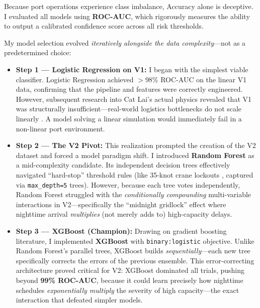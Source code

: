 \documentclass[11pt, a4paper]{article}
\begin{document}
Because port operations experience class imbalance, Accuracy alone is deceptive. I evaluated all models using \textbf{ROC-AUC}, which rigorously measures the ability to output a calibrated confidence score across all risk thresholds.

My model selection evolved \textit{iteratively alongside the data complexity}---not as a predetermined choice:

\begin{itemize}[nosep, leftmargin=1.5em]
    \item \textbf{Step 1 --- Logistic Regression on V1:} I began with the simplest viable classifier. Logistic Regression achieved $>$98\% ROC-AUC on the linear V1 data, confirming that the pipeline and features were correctly engineered. However, subsequent research into Cat Lai's actual physics \cite{saigon_newport, vietnamnet_catlai} revealed that V1 was structurally insufficient---real-world logistics bottlenecks do not scale linearly \cite{mm1_queue}. A model solving a linear simulation would immediately fail in a non-linear port environment.
    
    \item \textbf{Step 2 --- The V2 Pivot:} This realization prompted the creation of the V2 dataset and forced a model paradigm shift. I introduced \textbf{Random Forest} as a mid-complexity candidate. Its independent decision trees effectively navigated ``hard-stop'' threshold rules (like 35-knot crane lockouts \cite{pema_wind}, captured via \texttt{max\_depth=5} trees). However, because each tree votes independently, Random Forest struggled with the \textit{conditionally compounding} multi-variable interactions in V2---specifically the ``midnight gridlock'' effect \cite{vietnamnet_catlai} where nighttime arrival \textit{multiplies} (not merely adds to) high-capacity delays.
    
    \item \textbf{Step 3 --- XGBoost (Champion):} Drawing on gradient boosting literature, I implemented \textbf{XGBoost} with \texttt{binary:logistic} objective. Unlike Random Forest's parallel trees, XGBoost builds \textit{sequentially}---each new tree specifically corrects the errors of the previous ensemble. This error-correcting architecture proved critical for V2: XGBoost dominated all trials, pushing beyond \textbf{99\% ROC-AUC}, because it could learn precisely how nighttime schedules \textit{exponentially multiply} the severity of high capacity---the exact interaction that defeated simpler models.
\end{itemize}
\end{document}
